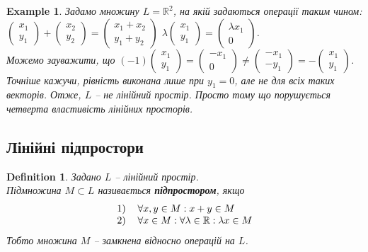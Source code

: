 \documentclass[a4paper, 10pt]{article}
\theoremstyle{theoremdd}
\newtheorem{definition}[theorem]{Definition}
\newtheorem{example}[theorem]{Example}
\begin{document}
	\begin{example}
	Задамо множину $L = \mathbb{R}^2$, на якій задаються операції таким чином:\\
	$\begin{pmatrix}
	x_1 \\ y_1
	\end{pmatrix} + \begin{pmatrix}
	x_2 \\ y_2
	\end{pmatrix} = \begin{pmatrix}
	x_1 + x_2 \\ y_1+y_2
	\end{pmatrix}$ \quad $\lambda \begin{pmatrix}
	x_1 \\ y_1
	\end{pmatrix} = \begin{pmatrix}
	\lambda x_1 \\ 0
	\end{pmatrix}$.\\
	Можемо зауважити, що $(-1) \begin{pmatrix}
	x_1 \\ y_1
	\end{pmatrix} = \begin{pmatrix}
	-x_1 \\ 0
	\end{pmatrix} \neq \begin{pmatrix}
	-x_1 \\ -y_1
	\end{pmatrix} = - \begin{pmatrix}
	x_1 \\ y_1
	\end{pmatrix}$. Точніше кажучи, рівність виконана лише при $y_1 = 0$, але не для всіх таких векторів. Отже, $L$ -- не лінійний простір. Просто тому що порушується четверта властивість лінійних просторів.
	\end{example}
	
	\subsection{Лінійні підпростори}
	\begin{definition}
	Задано $L$ -- лінійний простір.\\
	Підмножина $M \subset L$ називається \textbf{підпростором}, якщо
	\begin{align*}
	\begin{tabular}{cl}
	1) & $\forall x, y \in M: x + y \in M$\\
	2) & $\forall x \in M: \forall \lambda \in \mathbb{R}: \lambda x \in M$\\
	\end{tabular}
	\end{align*}
	Тобто множина $M$ -- замкнена відносно операцій на $L$.
	\end{definition}
	
\end{document}
